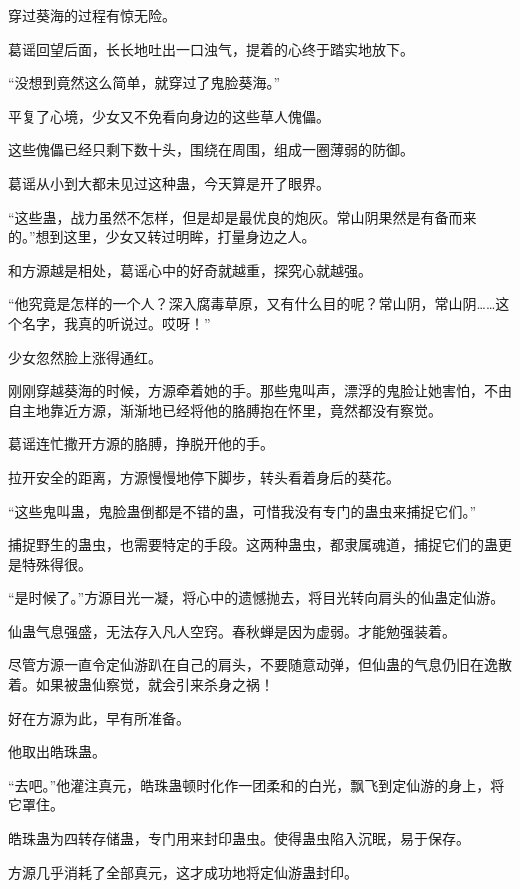 
\begin{this_body}



穿过葵海的过程有惊无险。

葛谣回望后面，长长地吐出一口浊气，提着的心终于踏实地放下。

“没想到竟然这么简单，就穿过了鬼脸葵海。”

平复了心境，少女又不免看向身边的这些草人傀儡。

这些傀儡已经只剩下数十头，围绕在周围，组成一圈薄弱的防御。

葛谣从小到大都未见过这种蛊，今天算是开了眼界。

“这些蛊，战力虽然不怎样，但是却是最优良的炮灰。常山阴果然是有备而来的。”想到这里，少女又转过明眸，打量身边之人。

和方源越是相处，葛谣心中的好奇就越重，探究心就越强。

“他究竟是怎样的一个人？深入腐毒草原，又有什么目的呢？常山阴，常山阴……这个名字，我真的听说过。哎呀！”

少女忽然脸上涨得通红。

刚刚穿越葵海的时候，方源牵着她的手。那些鬼叫声，漂浮的鬼脸让她害怕，不由自主地靠近方源，渐渐地已经将他的胳膊抱在怀里，竟然都没有察觉。

葛谣连忙撒开方源的胳膊，挣脱开他的手。

拉开安全的距离，方源慢慢地停下脚步，转头看着身后的葵花。

“这些鬼叫蛊，鬼脸蛊倒都是不错的蛊，可惜我没有专门的蛊虫来捕捉它们。”

捕捉野生的蛊虫，也需要特定的手段。这两种蛊虫，都隶属魂道，捕捉它们的蛊更是特殊得很。

“是时候了。”方源目光一凝，将心中的遗憾抛去，将目光转向肩头的仙蛊定仙游。

仙蛊气息强盛，无法存入凡人空窍。春秋蝉是因为虚弱。才能勉强装着。

尽管方源一直令定仙游趴在自己的肩头，不要随意动弹，但仙蛊的气息仍旧在逸散着。如果被蛊仙察觉，就会引来杀身之祸！

好在方源为此，早有所准备。

他取出皓珠蛊。

“去吧。”他灌注真元，皓珠蛊顿时化作一团柔和的白光，飘飞到定仙游的身上，将它罩住。

皓珠蛊为四转存储蛊，专门用来封印蛊虫。使得蛊虫陷入沉眠，易于保存。

方源几乎消耗了全部真元，这才成功地将定仙游蛊封印。


\end{this_body}
